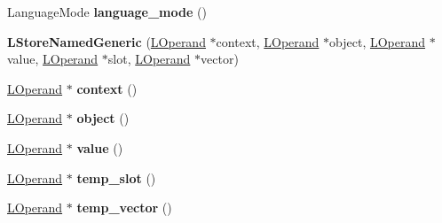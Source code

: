 \begin{DoxyCompactItemize}
\item 
Language\+Mode {\bfseries language\+\_\+mode} ()\hypertarget{classv8_1_1internal_1_1_l_store_named_generic_a9aaa8911322a00bb960fa5f3e132ee3c}{}\label{classv8_1_1internal_1_1_l_store_named_generic_a9aaa8911322a00bb960fa5f3e132ee3c}

\item 
{\bfseries L\+Store\+Named\+Generic} (\hyperlink{classv8_1_1internal_1_1_l_operand}{L\+Operand} $\ast$context, \hyperlink{classv8_1_1internal_1_1_l_operand}{L\+Operand} $\ast$object, \hyperlink{classv8_1_1internal_1_1_l_operand}{L\+Operand} $\ast$value, \hyperlink{classv8_1_1internal_1_1_l_operand}{L\+Operand} $\ast$slot, \hyperlink{classv8_1_1internal_1_1_l_operand}{L\+Operand} $\ast$vector)\hypertarget{classv8_1_1internal_1_1_l_store_named_generic_a5e3f7dd8c808499319eaac553c49aea7}{}\label{classv8_1_1internal_1_1_l_store_named_generic_a5e3f7dd8c808499319eaac553c49aea7}

\item 
\hyperlink{classv8_1_1internal_1_1_l_operand}{L\+Operand} $\ast$ {\bfseries context} ()\hypertarget{classv8_1_1internal_1_1_l_store_named_generic_ae430bd465f69e64a24f1f9f99a9c91ad}{}\label{classv8_1_1internal_1_1_l_store_named_generic_ae430bd465f69e64a24f1f9f99a9c91ad}

\item 
\hyperlink{classv8_1_1internal_1_1_l_operand}{L\+Operand} $\ast$ {\bfseries object} ()\hypertarget{classv8_1_1internal_1_1_l_store_named_generic_aa1b18be662cea0c3778374ff8b43defe}{}\label{classv8_1_1internal_1_1_l_store_named_generic_aa1b18be662cea0c3778374ff8b43defe}

\item 
\hyperlink{classv8_1_1internal_1_1_l_operand}{L\+Operand} $\ast$ {\bfseries value} ()\hypertarget{classv8_1_1internal_1_1_l_store_named_generic_aec8db1a93603a3b4113708cbceebcec8}{}\label{classv8_1_1internal_1_1_l_store_named_generic_aec8db1a93603a3b4113708cbceebcec8}

\item 
\hyperlink{classv8_1_1internal_1_1_l_operand}{L\+Operand} $\ast$ {\bfseries temp\+\_\+slot} ()\hypertarget{classv8_1_1internal_1_1_l_store_named_generic_a18a6a60e809a89d7846e671670701c0d}{}\label{classv8_1_1internal_1_1_l_store_named_generic_a18a6a60e809a89d7846e671670701c0d}

\item 
\hyperlink{classv8_1_1internal_1_1_l_operand}{L\+Operand} $\ast$ {\bfseries temp\+\_\+vector} ()\hypertarget{classv8_1_1internal_1_1_l_store_named_generic_a128a00fb66f92d2aafae55ae0b99b887}{}\label{classv8_1_1internal_1_1_l_store_named_generic_a128a00fb66f92d2aafae55ae0b99b887}


\end{DoxyCompactItemize}
